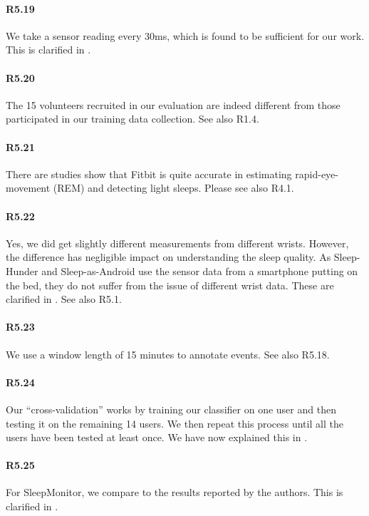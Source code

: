 \paragraph{R5.19} We take a sensor reading every 30ms, which is found to be sufficient for our work. This is clarified in .

\paragraph{R5.20} The 15 volunteers recruited in our evaluation are indeed different from those participated in our training data collection. See also R1.4.

\paragraph{R5.21} There are studies show that Fitbit is quite accurate in estimating rapid-eye-movement (REM) and detecting light sleeps. Please see also R4.1.

\paragraph{R5.22} Yes, we did get slightly different measurements from different wrists. However, the difference has negligible impact on
understanding the sleep quality. As Sleep-Hunder and Sleep-as-Android use the sensor data from a smartphone putting on the bed, they do not
suffer from the issue of different wrist data. These are clarified in . See also R5.1.


\paragraph{R5.23} We use a window length of 15 minutes to annotate events. See also R5.18.

\paragraph{R5.24} Our ``cross-validation” works by training our classifier on one user and then testing it on the remaining 14 users. We then repeat this process until all the users have been tested at least once. We have now explained this in .


\paragraph{R5.25} For SleepMonitor, we compare to the results reported by the authors. This is clarified in .

